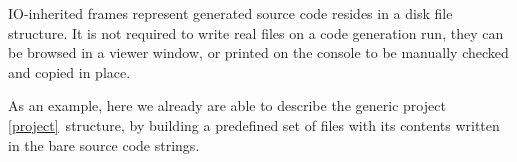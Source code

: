 
IO-inherited frames represent generated source code resides in a disk file
structure. It is not required to write real files on a code generation run, they
can be browsed in a viewer window, or printed on the console to be manually
checked and copied in place.


As an example, here we already are able to describe the generic project
\ref{project}\ structure, by building a predefined set of files with its
contents written in the bare source code strings.

